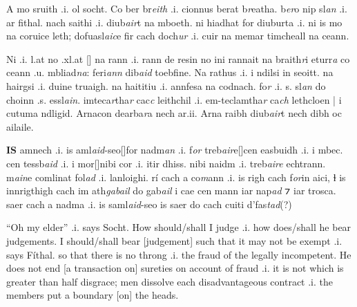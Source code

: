 \documentclass[11pt]{article}
\begin{document}
\begin{pages}
  \begin{Leftside}
    \beginnumbering
    
    \pstart
    A mo sruith .i. ol socht. Co ber br\emph{eith} .i. cionnus berat b\emph{r}eatha.  b\emph{er}o nip sl\emph{an} .i. ar fithal.  nach saithi .i. diub\emph{air}t na mboeth.  ni hiadhat  for diuburta .i. ni is mo na coruice leth; dofuasl\emph{aic}e fir cach doch\emph{ur} .i. cuir na memar timcheall na ceann. 
    \pend

    \pstart
    Ni  .i. l.at no .xl.at [\hspace{2mm}] na rann .i. rann de resin  no ini rannait na braith\emph{r}i eturr\emph{a} co ceann .u. mbliad\emph{na}: feri\emph{ann} dib\emph{aid} toebfine.  Na rathus .i. i ndilsi in seoitt. na hairgsi .i. duine truaigh.  na haititiu .i. annfesa na codnach.  fo\emph{r}  .i. s. sl\emph{an} do choinn .s. essl\emph{ain}. imteca\emph{r}tha\emph{r} cac\emph{c} leithchil  .i. em-teclamtha\emph{r} ca\emph{ch} lethcloen | i cutuma ndligid.  Arnacon dearba\emph{r}a nech ar.ii.  Arna raibh diub\emph{air}t nech dibh oc ailaile.
    \pend
    
    \pstart
    \textbf{IS} amnech .i. is aml\emph{aid}-seo[\hspace{2mm}]for nadm\emph{an} .i. f\emph{or} treb\emph{air}e[\hspace{2mm}]cen easbuidh .i. i mbec.  cen tessb\emph{aid} .i. i mor[\hspace{2mm}]nibi cor .i. itir dhiss.  nibi naidm .i. treb\emph{aire} echtrann.  m\emph{ain}e comlinat fol\emph{ad} .i. lanloighi. r\'{i} cach a co\emph{m}ann .i. is righ cach f\emph{or}in  aici, ɫ is innrigthigh cach im ath\emph{gabail} do gab\emph{ail} i cae cen mann iar nap\emph{ad} ⁊ iar trosca.  saer cach a nadma .i. is saml\emph{aid}-seo is saer do cach cuiti  d'fas\emph{tad}(?)
    \pend
    \endnumbering
  \end{Leftside}

  \begin{Rightside}
    \beginnumbering
    
    \pstart
    \enquote{Oh my elder} .i. says Socht.  How should/shall I judge .i. how does/shall he bear judgements.  I should/shall bear [judgement] such that it may not be exempt .i. says F\'{i}thal. so that there is no throng .i. the fraud of the legally incompetent.  He does not end [a transaction on] sureties on account of fraud .i. it is not which is greater than half disgrace; men dissolve each disadvantageous contract .i. the members put a boundary [on] the heads.   
    \pend
    

\end{Rightside}
\end{pages}
\end{document}
